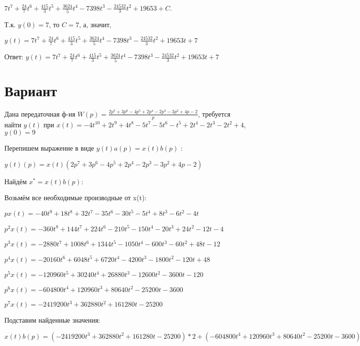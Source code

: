\documentclass{article}
\begin{document}
{{{{$7t^{7}+\frac{24}{7}t^{6}+\frac{415}{3}t^{5}+\frac{3624}{5}t^{4}-7398t^{3}-\frac{24532}{3}t^{2}+19653+C.$

Т.к. $y(0)=7$, то $C=7$, а, значит, 

$y(t)=7t^{7}+\frac{24}{7}t^{6}+\frac{415}{3}t^{5}+\frac{3624}{5}t^{4}-7398t^{3}-\frac{24532}{3}t^{2}+19653t+7$

Ответ: $y(t) = 7t^{7}+\frac{24}{7}t^{6}+\frac{415}{3}t^{5}+\frac{3624}{5}t^{4}-7398t^{3}-\frac{24532}{3}t^{2}+19653t+7$

\section{Вариант}

Дана передаточная ф-ия $W(p)=\frac{2p^{7}+3p^{6}-4p^{5}+2p^{4}-2p^{3}-3p^{2}+4p-2}{p}$, требуется найти $y(t)$ при $x(t)=-4t^{10}+2t^{9}+4t^{8}-5t^{7}-5t^{6}-t^{5}+2t^{4}-2t^{3}-2t^{2}+4$, $y(0)=9$

Перепишем выражение в виде $y(t)a(p)=x(t)b(p)$ :

$y(t)(p)=x(t)(2p^{7}+3p^{6}-4p^{5}+2p^{4}-2p^{3}-3p^{2}+4p-2)$

Найдём $x^*=x(t)b(p)$:

Возьмём все необходимые производные от x(t):

$px(t)=-40t^{9}+18t^{8}+32t^{7}-35t^{6}-30t^{5}-5t^{4}+8t^{3}-6t^{2}-4t$

$p^2x(t)=-360t^{8}+144t^{7}+224t^{6}-210t^{5}-150t^{4}-20t^{3}+24t^{2}-12t-4$

$p^3x(t)=-2880t^{7}+1008t^{6}+1344t^{5}-1050t^{4}-600t^{3}-60t^{2}+48t-12$

$p^4x(t)=-20160t^{6}+6048t^{5}+6720t^{4}-4200t^{3}-1800t^{2}-120t+48$

$p^5x(t)=-120960t^{5}+30240t^{4}+26880t^{3}-12600t^{2}-3600t-120$

$p^6x(t)=-604800t^{4}+120960t^{3}+80640t^{2}-25200t-3600$

$p^7x(t)=-2419200t^{3}+362880t^{2}+161280t-25200$

Подставим найденные значения:

$x(t)b(p) = (-2419200t^{3}+362880t^{2}+161280t-25200)*2+(-604800t^{4}+120960t^{3}+80640t^{2}-25200t-3600)*3+(-120960t^{5}+30240t^{4}+26880t^{3}-12600t^{2}-3600t-120)*(-4)+(-20160t^{6}+6048t^{5}+6720t^{4}-4200t^{3}-1800t^{2}-120t+48)*2+(-2880t^{7}+1008t^{6}+1344t^{5}-1050t^{4}-600t^{3}-60t^{2}+48t-12)*(-2)+(-360t^{8}+144t^{7}+224t^{6}-210t^{5}-150t^{4}-20t^{3}+24t^{2}-12t-4)*(-3)+(-40t^{9}+18t^{8}+32t^{7}-35t^{6}-30t^{5}-5t^{4}+8t^{3}-6t^{2}-4t)*4+(-40t^{9}+18t^{8}+32t^{7}-35t^{6}-30t^{5}-5t^{4}+8t^{3}-6t^{2}-4t)*(-2)=-80t^{9}+1116t^{8}+5392t^{7}-43078t^{6}+493818t^{5}-1919380t^{4}-4590164t^{3}+1014516t^{2}+261052t$





}}}}
\end{document}

